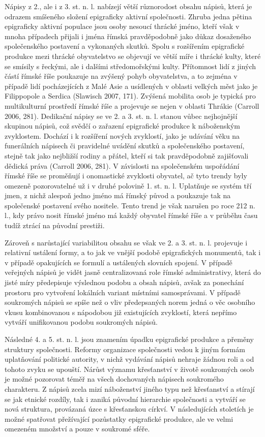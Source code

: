 Nápisy z 2., ale i z 3. st. n. l. nabízejí větší různorodost obsahu nápisů, která je odrazem smíšeného složení epigraficky aktivní společnosti. Zhruba jedna pětina epigraficky aktivní populace jsou osoby nesoucí thrácké jméno, kteří však v mnoha případech přijali i jména římská pravděpodobně jako důkaz dosaženého společenského postavení a vykonaných skutků. Spolu s rozšířením epigrafické produkce mezi thrácké obyvatelstvo se objevují ve větší míře i thrácké kulty, které se smísily s řeckými, ale i dalšími středomořskými kulty. Přítomnost lidí z jiných částí římské říše poukazuje na zvýšený pohyb obyvatelstva, a to zejména v případě lidí pocházejících z Malé Asie a usídlených v oblasti velkých měst jako je Filippopole a Serdica (Slawisch 2007, 171). Zvýšená mobilita osob je typická pro multikulturní prostředí římské říše a projevuje se nejen v oblasti Thrákie (Carroll 2006, 281). Dedikační nápisy se ve 2. a 3. st. n. l. stanou vůbec nejhojnější skupinou nápisů, což svědčí o zařazení epigrafické produkce k náboženským zvyklostem. Dochází i k rozšíření nových zvyklostí, jako je udávání věku na funerálních nápisech či pravidelné uvádění skutků a společenského postavení, stejně tak jako nejbližší rodiny a přátel, kteří si tak pravděpodobně zajišťovali dědická práva (Carroll 2006, 281). V závislosti na společenském uspořádání římské říše se proměňují i onomastické zvyklosti obyvatel, ač tyto trendy byly omezeně pozorovatelné už i v druhé polovině 1. st. n. l. Uplatňuje se systém tří jmen, z nichž alespoň jedno jméno má římský původ a poukazuje tak na společenské postavení svého nositele. Tento trend je však narušen po roce 212 n. l., kdy právo nosit římské jméno má každý obyvatel římské říše a v průběhu času tudíž ztrácí na původní prestiži.

Zároveň s narůstající variabilitou obsahu se však ve 2. a 3. st. n. l. projevuje i relativní ustálení formy, a to jak ve vnější podobě epigrafických monumentů, tak i v případě opakujících se formulí a ustálených slovních spojení. V případě veřejných nápisů je vidět jasně centralizovaná role římské administrativy, která do jisté míry předepisuje výslednou podobu a obsah nápisů, avšak za ponechání prostoru pro vytvoření lokálních variant místními samosprávami. V případě soukromých nápisů se spíše než o vliv předepsaných norem jedná o věc osobního vkusu kombinovanou s nápodobou již existujících zvyklostí, která nepřímo vytváří unifikovanou podobu soukromých nápisů.

Následné 4. a 5. st. n. l. jsou znamením úpadku epigrafické produkce a přeměny struktury společnosti. Reformy organizace společnosti vedou k jiným formám uplatňování politické autority, v nichž vydávání nápisů nehraje žádnou roli a od tohoto zvyku se upouští. Nárůst významu křesťanství v životě soukromých osob je možné pozorovat téměř na všech dochovaných nápisech soukromého charakteru. Z nápisů zcela mizí náboženství jiného typu než křesťanství a stírají se jak etnické rozdíly, tak i zaniká původní hierarchie společnosti a vytváří se nová struktura, provázaná úzce s křesťanskou církví. V následujících stoletích je možné spatřovat přežívající pozůstatky epigrafické produkce, ale ve velmi omezeném množství a pouze v soukromé sféře.

